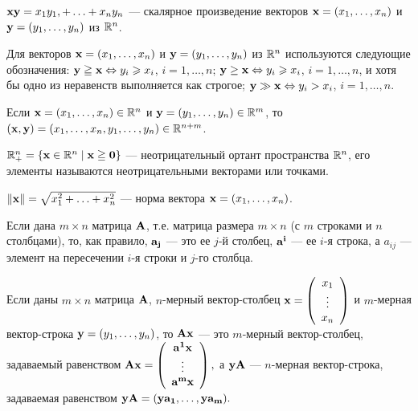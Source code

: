     $\mathbf{x}\mathbf{y}=x_{1}y_{1},+\ldots+x_{n}y_{n}$ --- скалярное
     произведение векторов $\mathbf{x}=(x_{1},\ldots,x_{n})$ и
     $\mathbf{y}=(y_{1},\ldots,y_{n})$ из $\mathbb{R}^{n}$.

     Для векторов
      $\mathbf{x}=(x_{1},\ldots,x_{n})$ и $\mathbf{y}=(y_{1},\ldots,y_{n})$
      из $\mathbb{R}^{n}$ используются следующие обозначения:
      $\mathbf{y} \geqq \mathbf{x} \Leftrightarrow y_i \geqslant x_i$, $i=1, \ldots, n$;
    $\mathbf{y} \geq \mathbf{x} \Leftrightarrow y_i \geqslant x_i$, $i=1, \ldots, n$, и хотя бы одно из
неравенств выполняется как строгое;
    $\mathbf{y} \gg \mathbf{x} \Leftrightarrow y_i > x_i$, $i=1,\ldots,n$.

    Если $\mathbf{x}=(x_{1},\ldots,x_{n})\in\mathbb{R}^{n}$ и
    $\mathbf{y}=(y_{1},\ldots,y_{n})\in\mathbb{R}^{m}$, то
    $(\mathbf{x},\mathbf{y})=(x_{1},\ldots,x_{n},y_{1},\ldots,y_{n})\in\mathbb{R}^{n+m}$.


    $\mathbb{R}^{n}_{+}=\{\mathbf{x}\in\mathbb{R}^{n}\mid \mathbf{x}\geqq \mathbf{0}\}$ ---
    неотрицательный ортант пространства $\mathbb{R}^{n}$, его элементы
    называются неотрицательными векторами или точками.

    $\|\mathbf{x}\|=\sqrt{x_{1}^{2}+\ldots+x_{n}^{2}}$ --- норма вектора
    $\mathbf{x}=(x_{1},\ldots,x_{n})$.

    Если дана $m\times n$ матрица $\mathbf{A}$, т.е. матрица размера $m\times n$
    (с $m$ строками и $n$ столбцами), то, как правило, $\mathbf{a_{j}}$
    --- это ее $j$-й столбец, $\mathbf{a^{i}}$ --- ее $i$-я строка, а
    $a_{ij}$ --- элемент на пересечении $i$-я строки и $j$-го
    столбца.


    Если даны $m\times n$ матрица $\mathbf{A}$, $n$-мерный
    вектор-столбец $\mathbf{x}=\left(
                                                                            \begin{array}{c}
                                                                              x_{1} \\
                                                                              \vdots\\
                                                                              x_{n} \\
                                                                            \end{array}
                                                                          \right)$
    и $m$-мерная вектор-строка $\mathbf{y}=(y_{1},\ldots,y_{n})$, то
    $\mathbf{A}\mathbf{x}$ --- это $m$-мерный вектор-столбец, задаваемый
    равенством
$
    \mathbf{A}\mathbf{x}=\left(
                   \begin{array}{c}
                     \mathbf{a^{1}}\mathbf{x}\\
                     \vdots \\
                     \mathbf{a^{m}}\mathbf{x} \\
                   \end{array}
                 \right),
$
    а $\mathbf{y}\mathbf{A}$ --- $n$-мерная вектор-строка, задаваемая
    равенством
$
    \mathbf{y}\mathbf{A}=(\mathbf{y}\mathbf{a_{1}},\ldots,\mathbf{y}\mathbf{a_{m}}).
$

